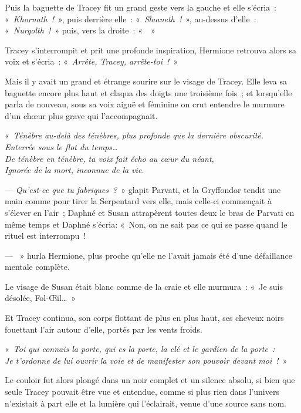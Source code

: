 Puis la baguette de Tracey fit un grand geste vers la gauche et elle s'écria~: «~\emph{Khornath~!}~», puis derrière elle~: «~\emph{Slaaneth~!}~», au-dessus d'elle~: «~\emph{Nurgolth~!}~» puis, vers la droite~: «~~»

Tracey s'interrompit et prit une profonde inspiration, Hermione retrouva alors sa voix et s'écria~: «~\emph{Arrête, Tracey, arrête-toi~!}~»

Mais il y avait un grand et étrange sourire sur le visage de Tracey.
Elle leva sa baguette encore plus haut et claqua des doigts une troisième fois~; et lorsqu'elle parla de nouveau, sous sa voix aiguë et féminine on crut entendre le murmure d'un chœur plus grave qui l'accompagnait.

«~\emph{Ténèbre au-delà des ténèbres, plus profonde que la dernière obscurité.\\
Enterrée sous le flot du temps…\\
De ténèbre en ténèbre, ta voix fait écho au cœur du néant,\\
Ignorée de la mort, inconnue de la vie.}

--- \emph{Qu'est-ce que tu fabriques~?}~» glapit Parvati, et la Gryffondor tendit une main comme pour tirer la Serpentard vers elle, mais celle-ci commençait à s'élever en l'air~; Daphné et Susan attrapèrent toutes deux le bras de Parvati en même temps et Daphné s'écria: «~Non, on ne sait pas ce qui se passe quand le rituel est interrompu~!

--- ~» hurla Hermione, plus proche qu'elle ne l'avait jamais été d'une défaillance mentale complète.

Le visage de Susan était blanc comme de la craie et elle murmura~: «~Je suis désolée, Fol-Œil…~»

Et Tracey continua, son corps flottant de plus en plus haut, ses cheveux noirs fouettant l'air autour d'elle, portés par les vents froids.

«~\emph{Toi qui connais la porte, qui es la porte, la clé et le gardien de la porte~:\\ Je t'ordonne de lui ouvrir la voie et de manifester son pouvoir devant moi~!}~»

Le couloir fut alors plongé dans un noir complet et un silence absolu, si bien que seule Tracey pouvait être vue et entendue, comme si plus rien dans l'univers n'existait à part elle et la lumière qui l'éclairait, venue d'une source sans nom.


